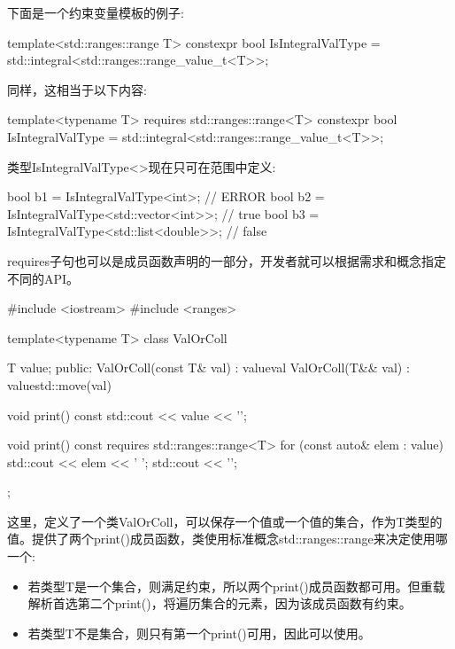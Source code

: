 
下面是一个约束变量模板的例子:

\begin{cpp}
template<std::ranges::range T>
constexpr bool IsIntegralValType = std::integral<std::ranges::range_value_t<T>>;
\end{cpp}

同样，这相当于以下内容:

\begin{cpp}
template<typename T>
requires std::ranges::range<T>
constexpr bool IsIntegralValType = std::integral<std::ranges::range_value_t<T>>;
\end{cpp}

类型IsIntegralValType<>现在只可在范围中定义:

\begin{cpp}
bool b1 = IsIntegralValType<int>; // ERROR
bool b2 = IsIntegralValType<std::vector<int>>; // true
bool b3 = IsIntegralValType<std::list<double>>; // false
\end{cpp}


requires子句也可以是成员函数声明的一部分，开发者就可以根据需求和概念指定不同的API。


\begin{cpp}
#include <iostream>
#include <ranges>

template<typename T>
class ValOrColl {
	T value;
	public:
	ValOrColl(const T& val)
	: value{val} {
	}
	ValOrColl(T&& val)
	: value{std::move(val)} {
	}
	
	void print() const {
		std::cout << value << '\n';
	}
	
	void print() const requires std::ranges::range<T> {
		for (const auto& elem : value) {
			std::cout << elem << ' ';
		}
		std::cout << '\n';
	}
};
\end{cpp}

这里，定义了一个类ValOrColl，可以保存一个值或一个值的集合，作为T类型的值。提供了两个print()成员函数，类使用标准概念std::ranges::range来决定使用哪一个:

\begin{itemize}
\item
若类型T是一个集合，则满足约束，所以两个print()成员函数都可用。但重载解析首选第二个print()，将遍历集合的元素，因为该成员函数有约束。

\item
若类型T不是集合，则只有第一个print()可用，因此可以使用。
\end{itemize}


